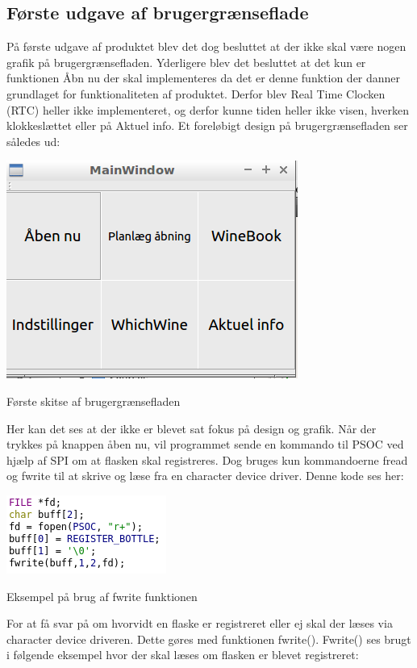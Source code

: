 \subsection*{Første udgave af brugergrænseflade}
På første udgave af produktet blev det dog besluttet at der ikke skal være nogen grafik på brugergrænsefladen. Yderligere blev det besluttet at det kun er funktionen Åbn nu der skal implementeres da det er denne funktion der danner grundlaget for funktionaliteten af produktet. Derfor blev Real Time Clocken  (RTC) heller ikke implementeret, og derfor kunne tiden heller ikke visen, hverken klokkeslættet eller på Aktuel info.
Et foreløbigt design på brugergrænsefladen ser således ud:

\includegraphics{Billeder/real_skitse}
\caption{Første skitse af brugergrænsefladen}

Her kan det ses at der ikke er blevet sat fokus på design og grafik. Når der trykkes på knappen åben nu, vil programmet sende en kommando til PSOC ved hjælp af SPI om at flasken skal registreres. Dog bruges kun kommandoerne fread og fwrite til at skrive og læse fra en character device driver. Denne kode ses her:

\includegraphics{Billeder/write}
\caption{Eksempel på brug af fwrite funktionen}

For at få svar på om hvorvidt en flaske er registreret eller ej skal der læses via character device driveren. Dette gøres med funktionen fwrite(). Fwrite() ses brugt i følgende eksempel hvor der skal læses om flasken er blevet registreret:

